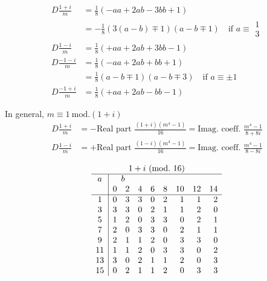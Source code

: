 \[
\begin{aligned}
D\frac{1+i}m&=\tfrac18(-aa+2ab-3bb+1)\\
&=-\tfrac18(3(a-b)\mp1)(a-b\mp1)\quad\text{if }a\equiv\substack{1\\3}\\
D\frac{1-i}m&=\tfrac18(+aa+2ab+3bb-1)\\
D\frac{-1-i}m&=\tfrac18(-aa+2ab+bb+1)\\
&=\tfrac18(a-b\mp1)(a-b\mp3)\quad\text{if }a\equiv\pm1\\
D\frac{-1+i}m&=\tfrac18(+aa+2ab-bb-1)
\end{aligned}
\]


In general, $m\equiv1\ \mathrm{mod.}(1+i)$
\[
\begin{aligned}
D\frac{1+i}m&=-\text{Real part }\frac{(1+i)(m^4-1)}{16}=\text{Imag. coeff. }\frac{m^4-1}{8+8i}\\
D\frac{1-i}m&=+\text{Real part }\frac{(1-i)(m^4-1)}{16}=\text{Imag. coeff. }\frac{m^4-1}{8-8i}
\end{aligned}
\]

\[
\begin{array}{c|rrrrrrrr}
\multicolumn{9}{c}{1+i\ (\mathrm{mod.}\ 16)}\\\hline
a&\multicolumn{8}{l}{\quad b}\\
&0&2&4&6&8&10&12&14\\\hline
1&0&3&3&0&2&1&1&2\\
3&3&3&0&2&1&1&2&0\\
5&1&2&0&3&3&0&2&1\\
7&2&0&3&3&0&2&1&1\\
9&2&1&1&2&0&3&3&0\\
11&1&1&2&0&3&3&0&2\\
13&3&0&2&1&1&2&0&3\\
15&0&2&1&1&2&0&3&3
\end{array}
\]
